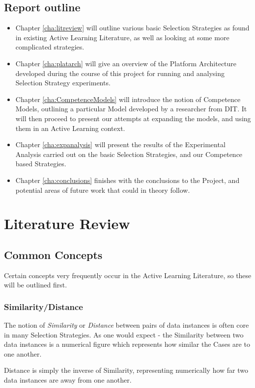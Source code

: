 \documentclass[a4paper,11pt]{report}
\begin{document}
\section{Report outline}
\begin{itemize}
	\item Chapter \ref{cha:litreview} will outline various basic Selection Strategies as found in existing Active Learning Literature, as well as looking at some more complicated strategies.
	\item Chapter \ref{cha:platarch} will give an overview of the Platform Architecture developed during the course of this project for running and analysing Selection Strategy experiments.
	\item Chapter \ref{cha:CompetenceModels} will introduce the notion of Competence Models, outlining a particular Model developed by a researcher from DIT. It will then proceed to present our attempts at expanding the models, and using them in an Active Learning context.
	\item Chapter \ref{cha:expanalysis} will present the results of the Experimental Analysis carried out on the basic Selection Strategies, and our Competence based Strategies.
	\item Chapter \ref{cha:conclusions} finishes with the conclusions to the Project, and potential areas of future work that could in theory follow.
\end{itemize}

\chapter{Literature Review\label{cha:litreview}}

\section{Common Concepts}
Certain concepts very frequently occur in the Active Learning Literature, so these will be outlined first.

\subsection{Similarity/Distance}
The notion of \emph{Similarity} or \emph{Distance} between pairs of data instances is often core in many Selection Strategies. As one would expect - the Similarity between two data instances is a numerical figure which represents how similar the Cases are to one another.

Distance is simply the inverse of Similarity, representing numerically how far two data instances are away from one another.
\end{document}
